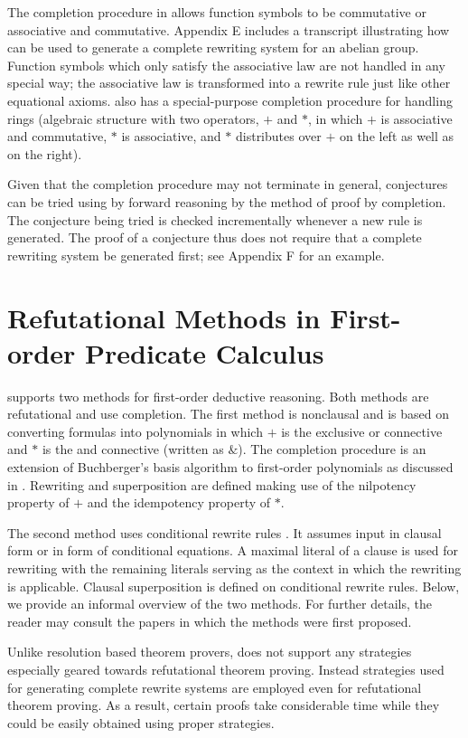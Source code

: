 The completion procedure in \RRL allows function symbols to be
commutative or associative and commutative. Appendix E includes a
transcript illustrating how \RRL can be used to generate a
complete rewriting system for an abelian group. Function symbols
which only satisfy the associative law are not handled in any
special way; the associative law is transformed into a rewrite
rule just like other equational axioms. \RRL also has a
special-purpose completion procedure for handling rings
(algebraic structure with two operators, $+$ and $*$, in which
$+$ is associative and commutative, $*$ is associative, and $*$
distributes over $+$ on the left as well as on the right).

Given that the completion procedure may not terminate in general,
conjectures can be tried using \RRL by forward reasoning by the
method of proof by completion. The conjecture being tried is
checked incrementally whenever a new rule is generated. The proof
of a conjecture thus does not require that a complete rewriting
system be generated first; see Appendix F for an example.

\section{Refutational Methods in First-order Predicate Calculus}

\RRL supports two methods for first-order deductive reasoning. Both
methods are refutational and use completion. The first method is
nonclausal and is based on converting formulas into polynomials
in which $+$ is the exclusive or connective and $*$ is the and
connective (written as $\&$). The completion procedure is an extension of
Buchberger's \Groebner basis algorithm to first-order polynomials
as discussed in \cite{KN85}.  Rewriting and superposition are
defined making use of the nilpotency property of $+$ and the
idempotency property of $*$.

The second method uses conditional rewrite rules \cite{ZK88}.
It assumes input in clausal form or in form of conditional equations. 
A maximal literal of a clause is used for rewriting with the
remaining literals serving as the context in which the rewriting
is applicable. Clausal superposition is defined on conditional
rewrite rules. Below, we provide an informal overview of the two
methods. For further details, the reader may consult the papers
in which the methods were first proposed.

Unlike resolution based theorem provers,
\RRL does not support any strategies especially geared towards refutational
theorem proving. Instead strategies used for generating complete
rewrite systems are employed even for refutational theorem
proving.  As a result, certain proofs take considerable time
while they could be easily obtained using proper strategies.

